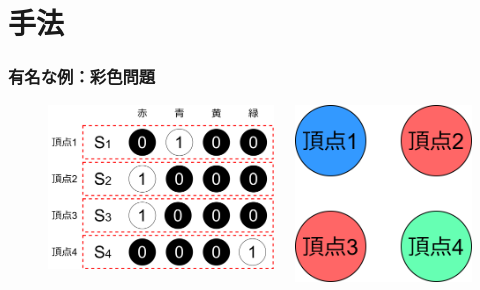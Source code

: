 \section{手法}
\begin{frame}
  \frametitle{有名な例：彩色問題}
  \begin{figure}[h]
    \begin{columns}
      \begin{column}{0.55\linewidth}        
        \includegraphics[width=0.9\linewidth]{data/GCP_example}
      \end{column}
      \begin{column}{0.45\linewidth}
        \centering
        \includegraphics[width=0.5\linewidth]{data/GCP_example_graph}    
      \end{column}
    \end{columns}
  \end{figure}
\end{frame}

